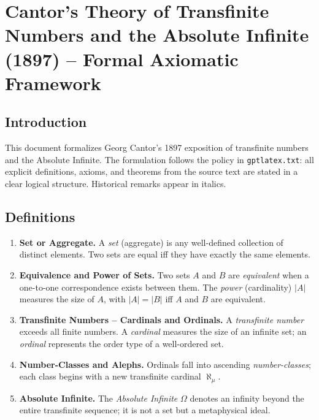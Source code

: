 \documentclass[11pt]{article}
\begin{document}
\section*{Cantor's Theory of Transfinite Numbers and the Absolute Infinite (1897) -- Formal Axiomatic Framework}

\subsection*{Introduction}
This document formalizes Georg Cantor's 1897 exposition of transfinite numbers and the Absolute Infinite.  The formulation follows the policy in \texttt{gptlatex.txt}: all explicit definitions, axioms, and theorems from the source text are stated in a clear logical structure.  Historical remarks appear in italics.

\subsection*{Definitions}
\begin{enumerate}
  \item \textbf{Set or Aggregate.} A \emph{set} (aggregate) is any well-defined collection of distinct elements. Two sets are equal iff they have exactly the same elements.\label{def:set}
  \item \textbf{Equivalence and Power of Sets.} Two sets $A$ and $B$ are \emph{equivalent} when a one-to-one correspondence exists between them. The \emph{power} (cardinality) $|A|$ measures the size of $A$, with $|A|=|B|$ iff $A$ and $B$ are equivalent.\label{def:power}
  \item \textbf{Transfinite Numbers -- Cardinals and Ordinals.} A \emph{transfinite number} exceeds all finite numbers. A \emph{cardinal} measures the size of an infinite set; an \emph{ordinal} represents the order type of a well-ordered set.\label{def:transfinite}
  \item \textbf{Number-Classes and Alephs.} Ordinals fall into ascending \emph{number-classes}; each class begins with a new transfinite cardinal $\aleph_{\mu}$.\label{def:numberclass}
  \item \textbf{Absolute Infinite.} The \emph{Absolute Infinite} $\Omega$ denotes an infinity beyond the entire transfinite sequence; it is not a set but a metaphysical ideal.\label{def:absolute}
\end{enumerate}
\end{document}
